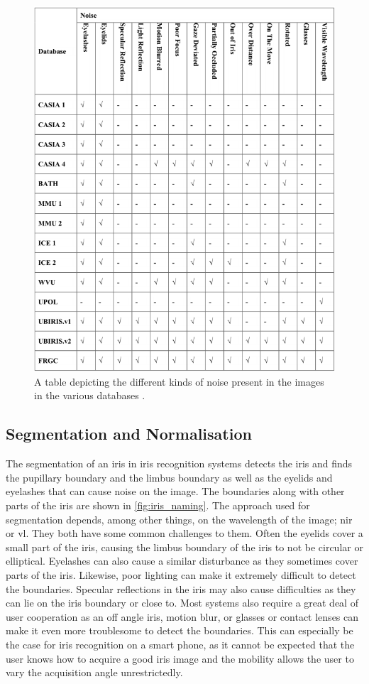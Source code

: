 \begin{figure}[H]
\centering
\includegraphics[width=\textwidth]{figures/Iris_Database_tabel_2.png} 
\caption{A table depicting the different kinds of noise present in the images in the various databases \citep{Rifaee2017}.}
\label{fig:Iris_database_2}
\end{figure}


\subsection{Segmentation and Normalisation}
The segmentation of an iris in iris recognition systems detects the iris and finds the pupillary boundary and the limbus boundary as well as the eyelids and eyelashes that can cause noise on the image. The boundaries along with other parts of the iris are shown in \autoref{fig:iris_naming}. The approach used for segmentation depends, among other things, on the wavelength of the image; \gls{nir} or \gls{vl}. They both have some common challenges to them. Often the eyelids cover a small part of the iris, causing the limbus boundary of the iris to not be circular or elliptical. Eyelashes can also cause a similar disturbance as they sometimes cover parts of the iris. Likewise, poor lighting can make it extremely difficult to detect the boundaries. Specular reflections in the iris may also cause difficulties as they can lie on the iris boundary or close to. Most systems also require a great deal of user cooperation as an off angle iris, motion blur, or glasses or contact lenses can make it even more troublesome to detect the boundaries. This can especially be the case for iris recognition on a smart phone, as it cannot be expected that the user knows how to acquire a good iris image and the mobility allows the user to vary the acquisition angle unrestrictedly. 

